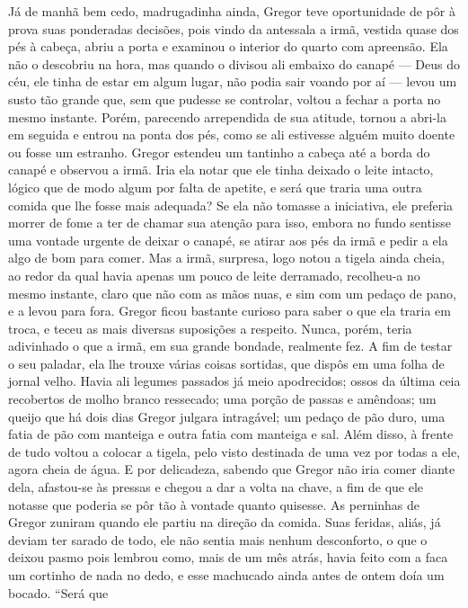 Já de manhã bem cedo, madrugadinha ainda, Gregor teve oportunidade de pôr
à prova suas ponderadas decisões, pois vindo da antessala a irmã, vestida
quase dos pés à cabeça, abriu a porta e examinou o interior do quarto com
apreensão. Ela não o descobriu na hora, mas quando o divisou ali embaixo
do canapé --- Deus do céu, ele tinha de estar em algum lugar, não podia sair
voando por aí --- levou um susto tão grande que, sem que pudesse se
controlar, voltou a fechar a porta no mesmo instante. Porém, parecendo
arrependida de sua atitude, tornou a abri-la em seguida e entrou na ponta
dos pés, como se ali estivesse alguém muito doente ou fosse um estranho.
Gregor estendeu um tantinho a cabeça até a borda do canapé e observou a
irmã. Iria ela notar que ele tinha deixado o leite intacto, lógico que de
modo algum por falta de apetite, e será que traria uma outra comida que
lhe fosse mais adequada? Se ela não tomasse a iniciativa, ele preferia
morrer de fome a ter de chamar sua atenção para isso, embora no fundo
sentisse uma vontade urgente de deixar o canapé, se atirar aos pés da irmã
e pedir a ela algo de bom para comer. Mas a irmã, surpresa, logo notou a
tigela ainda cheia, ao redor da qual havia apenas um pouco de leite
derramado, recolheu-a no mesmo instante, claro que não com as mãos nuas, e
sim com um pedaço de pano, e a levou para fora. Gregor ficou bastante
curioso para saber o que ela traria em troca, e teceu as mais diversas
suposições a respeito. Nunca, porém, teria adivinhado o que a irmã, em sua
grande bondade, realmente fez. A fim de testar o seu paladar, ela lhe
trouxe várias coisas sortidas, que dispôs em uma folha de jornal velho.
Havia ali legumes passados já meio apodrecidos; ossos da última ceia
recobertos de molho branco ressecado; uma porção de passas e amêndoas; um
queijo que há dois dias Gregor julgara intragável; um pedaço de pão duro,
uma fatia de pão com manteiga e outra fatia com manteiga e sal. Além
disso, à frente de tudo voltou a colocar a tigela, pelo visto destinada de
uma vez por todas a ele, agora cheia de água. E por delicadeza, sabendo
que Gregor não iria comer diante dela, afastou-se às pressas e chegou a
dar a volta na chave, a fim de que ele notasse que poderia se pôr tão à
vontade quanto quisesse. As perninhas de Gregor zuniram quando ele partiu
na direção da comida. Suas feridas, aliás, já deviam ter sarado de todo,
ele não sentia mais nenhum desconforto, o que o deixou pasmo pois lembrou
como, mais de um mês atrás, havia feito com a faca um cortinho de nada no
dedo, e esse machucado ainda antes de ontem doía um bocado. “Será que

